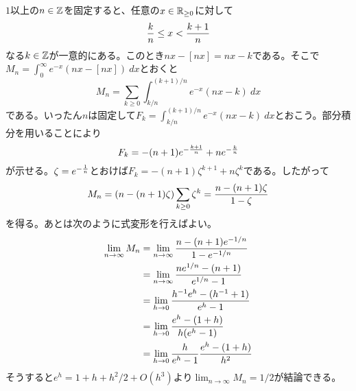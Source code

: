 \subsubsection{} %
\begin{sol}
  $1$以上の$n \in {\mathbb Z}$を固定すると、任意の$x \in {\mathbb R}_{\geq 0}$に対して
  \[
  \frac{k}{n} \leq x < \frac{k+1}{n}
  \]
  なる$k \in {\mathbb Z}$が一意的にある。このとき$nx - [nx] = nx - k$である。そこで$M_n = \int_0^{\infty} e^{-x}(nx - [nx]) \ dx$とおくと
  \[
  M_n = \sum_{k \geq 0} \int_{k/n}^{(k+1)/n} e^{-x}(nx - k) \ dx
  \]
  である。いったん$n$は固定して$F_k = \int_{k/n}^{(k+1)/n} e^{-x}(nx - k) \ dx$とおこう。部分積分を用いることにより
  \[
  F_k = -(n+1) e^{-\frac{k+1}{n}} + n e^{- \frac{k}{n}}
  \]
  が示せる。$\zeta = e^{-\frac{1}{n}}$とおけば$F_k = -(n+1)\zeta^{k+1} + n \zeta^k$である。したがって
  \begin{align*}
    M_n = (n - (n+1)\zeta) \sum_{k \geq 0} \zeta^k = \frac{n - (n+1)\zeta}{1 - \zeta}
  \end{align*}
  を得る。あとは次のように式変形を行えばよい。
  \begin{align*}
\lim_{n \to \infty} M_n &= \lim_{n \to \infty}  \frac{n - (n+1)e^{-1/n} }{1 - e^{-1/n}} \\
&= \lim_{n \to \infty}  \frac{ne^{1/n} - (n+1) }{e^{1/n} - 1} \\
&= \lim_{h \to 0}  \frac{ h^{-1} e^{h} - (h^{-1}+1) }{e^{h} - 1} \\
&= \lim_{h \to 0}  \frac{ e^{h} - (1 + h) }{ h(e^{h} - 1) } \\
&= \lim_{h \to 0}  \frac{h}{ e^{h} - 1 } \frac{ e^h - (1+h) }{ h^2 }
  \end{align*}
そうすると$e^h = 1 + h + h^2/2 + O(h^3)$より$\lim_{n \to \infty} M_n = 1/2$が結論できる。
\end{sol}

\newpage

